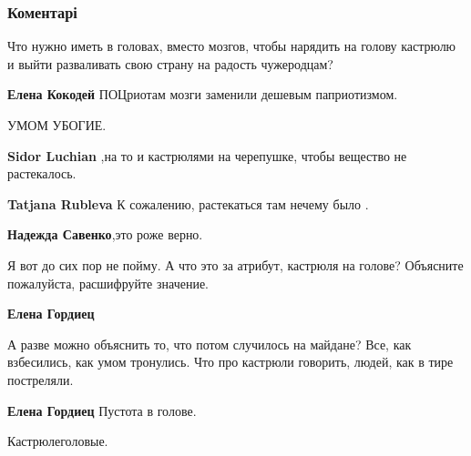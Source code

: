  
 
 
 
 
\subsubsection{Коментарі}

\begin{itemize} %

Что нужно иметь в головах, вместо мозгов, чтобы нарядить на голову кастрюлю и
выйти разваливать свою страну на радость чужеродцам?

\begin{itemize} %
\textbf{Елена Кокодей} ПОЦриотам мозги заменили дешевым паприотизмом.
\end{itemize} %

УМОМ УБОГИЕ.

\begin{itemize} %
\textbf{Sidor Luchian} ,на то и кастрюлями на черепушке, чтобы вещество не растекалось.

\textbf{Tatjana Rubleva} К сожалению, растекаться там нечему было .

\textbf{Надежда Савенко},это роже верно.
\end{itemize} %


Я вот до сих пор не пойму. А что это за атрибут, кастрюля на голове? Объясните
пожалуйста, расшифруйте значение.

\begin{itemize} %
\textbf{Елена Гордиец} 

А разве можно объяснить то, что потом случилось на майдане? Все, как
взбесились, как умом тронулись. Что про кастрюли говорить, людей, как в тире
постреляли.

\textbf{Елена Гордиец} Пустота в голове.
\end{itemize} %

Кастрюлеголовые.


\end{itemize}
